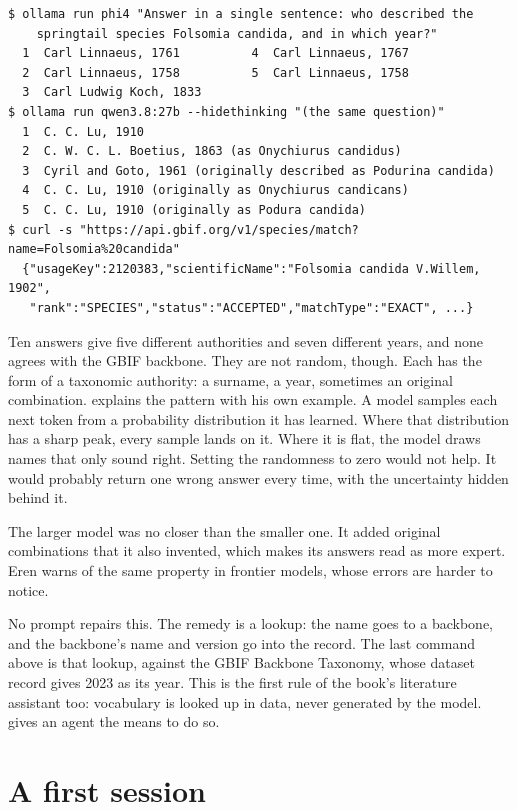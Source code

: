 \documentclass[11pt,a4paper]{article}
\begin{document}
\begin{lstlisting}[style=shell,caption={One question, ten answers, one lookup (11 November 2026)}]
$ ollama run phi4 "Answer in a single sentence: who described the
    springtail species Folsomia candida, and in which year?"
  1  Carl Linnaeus, 1761          4  Carl Linnaeus, 1767
  2  Carl Linnaeus, 1758          5  Carl Linnaeus, 1758
  3  Carl Ludwig Koch, 1833
$ ollama run qwen3.8:27b --hidethinking "(the same question)"
  1  C. C. Lu, 1910
  2  C. W. C. L. Boetius, 1863 (as Onychiurus candidus)
  3  Cyril and Goto, 1961 (originally described as Podurina candida)
  4  C. C. Lu, 1910 (originally as Onychiurus candicans)
  5  C. C. Lu, 1910 (originally as Podura candida)
$ curl -s "https://api.gbif.org/v1/species/match?name=Folsomia%20candida"
  {"usageKey":2120383,"scientificName":"Folsomia candida V.Willem, 1902",
   "rank":"SPECIES","status":"ACCEPTED","matchType":"EXACT", ...}
\end{lstlisting}

Ten answers give five different authorities and seven different years, and
none agrees with the GBIF backbone. They are not random, though. Each has the
form of a taxonomic authority: a surname, a year, sometimes an original
combination. \textcite{eren2026agenticcoding} explains the pattern with his
own example. A model samples each next token from a probability distribution
it has learned. Where that distribution has a sharp peak, every sample lands
on it. Where it is flat, the model draws names that only sound right. Setting
the randomness to zero would not help. It would probably return one wrong
answer every time, with the uncertainty hidden behind it.

The larger model was no closer than the smaller one. It added original
combinations that it also invented, which makes its answers read as more
expert. Eren warns of the same property in frontier models, whose errors are
harder to notice.

No prompt repairs this. The remedy is a lookup: the name goes to a backbone,
and the backbone's name and version go into the record. The last command
above is that lookup, against the GBIF Backbone Taxonomy, whose dataset
record gives 2023 as its year. This is the first rule of the book's
literature assistant too: vocabulary is looked up in data, never generated by
the model.  gives an agent the means to do so.

\section{A first session}
\label{sec:session}
\end{document}
